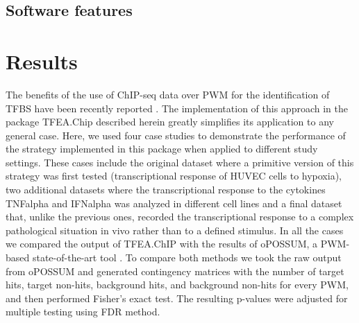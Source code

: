 \documentclass[10pt,letterpaper]{article}
\begin{document}
	\subsection*{Software features}
	
	\section*{Results}
	The benefits of the use of ChIP-seq data over PWM for the identification of TFBS have been recently reported \cite{Tiana2018a}. The implementation of this approach in the package TFEA.Chip described herein greatly simplifies its application to any general case. Here, we used four case studies to demonstrate the performance of the strategy implemented in this package when applied to different study settings. These cases include the original dataset where a primitive version of this strategy was first tested (transcriptional response of HUVEC cells to hypoxia), two additional datasets where the transcriptional response to the cytokines TNFalpha and IFNalpha was analyzed in different cell lines and a final dataset that, unlike the previous ones, recorded the transcriptional response to a complex pathological situation in vivo rather than to a defined stimulus. In all the cases we compared the output of TFEA.ChIP with the results of oPOSSUM, a PWM-based state-of-the-art tool \cite{Kwon2012}. To compare both methods we took the raw output from oPOSSUM and generated contingency matrices with the number of target hits, target non-hits, background hits, and background non-hits for every PWM, and then performed Fisher’s exact test. The resulting p-values were adjusted for multiple testing using FDR method.
	
\end{document}
